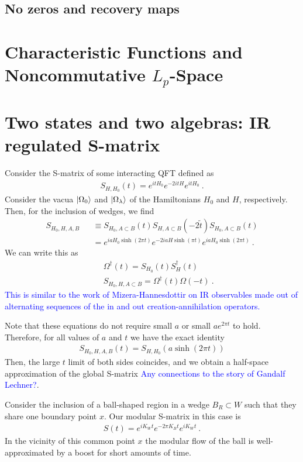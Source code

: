 \documentclass[a4paper,11pt]{article}
\theoremstyle{definition}
\newcommand{\nn}{\nonumber}
\newcommand{\NL}[1]{\textcolor{blue}{#1}}
\begin{document}
\subsection{No zeros and recovery maps}
\section{Characteristic Functions and Noncommutative $L_p$-Space}\label{section:lp}
\section{Two states and two algebras: IR regulated S-matrix}

Consider the S-matrix of some interacting QFT defined as
\begin{eqnarray}
S_{H,H_0}(t)=e^{i t H_0}e^{-2i t H}e^{it H_0}\ .
\end{eqnarray}
Consider the vacua $\ket{\Omega_0}$ and $\ket{\Omega_\lambda}$ of the Hamiltonians $H_0$ and $H$, respectively. Then, for the inclusion of wedges, we find
\begin{eqnarray}
S_{H_0,H,A,B}&&\equiv S_{H_0,A\subset B}(t) S_{H,A\subset B}(-2\tilde{t})S_{H_0,A\subset B}(t)\nn\\
&&=e^{i a H_0 \sinh(2\pi t)} e^{-2i a H \sinh(\pi t)}e^{i a H_0 \sinh(2\pi t)}\ .
\end{eqnarray}
We can write this as 
\begin{eqnarray}
    &&\Omega^\dagger(t)=S_{H_0}(t) S^\dagger_{H}(t)\nn\\
    &&S_{H_0,H,A\subset B}=\Omega^\dagger(t) \Omega(-t)\ .
\end{eqnarray}
\NL{This is similar to the work of Mizera-Hannesdottir on IR observables made out of alternating sequences of the in and out creation-annihilation operators.}


Note that these equations do not require small $a$ or small $ae^{2\pi t}$ to hold. Therefore, for all values of $a$ and $t$ we have the exact identity
\begin{eqnarray}
S_{H_0,H,A,B}(t)=S_{H,H_0}(a \sinh(2\pi t)) 
\end{eqnarray} 
Then, the large $t$ limit of both sides coincides, and we obtain a half-space approximation of the global S-matrix \NL{Any connections to the story of Gandalf Lechner?}.

Consider the inclusion of a ball-shaped region in a wedge $B_R\subset W$ such that they share one boundary point $x$. Our modular S-matrix in this case is
\begin{eqnarray}
S(t)=e^{i K_W t} e^{-2\pi K_B t} e^{i K_W t}\ .
\end{eqnarray}
In the vicinity of this common point $x$ the modular flow of the ball is well-approximated by a boost for short amounts of time. 
\end{document}
